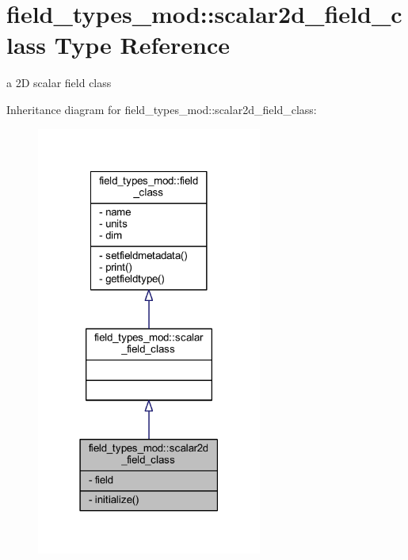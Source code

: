 \hypertarget{structfield__types__mod_1_1scalar2d__field__class}{}\section{field\+\_\+types\+\_\+mod\+:\+:scalar2d\+\_\+field\+\_\+class Type Reference}
\label{structfield__types__mod_1_1scalar2d__field__class}


a 2D scalar field class  




Inheritance diagram for field\+\_\+types\+\_\+mod\+:\+:scalar2d\+\_\+field\+\_\+class\+:
\nopagebreak
\begin{figure}[H]
\begin{center}
\leavevmode
\includegraphics[width=210pt]{structfield__types__mod_1_1scalar2d__field__class__inherit__graph}
\end{center}
\end{figure}



